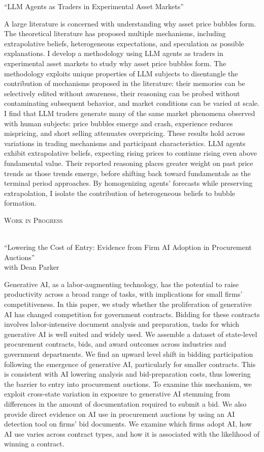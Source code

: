 \documentclass[11pt,a4paper]{article}
\newcommand{\header}[1]{
  {\hspace*{-18pt}\vspace*{6pt}\textsc{#1}}
  \vspace*{-6pt}\lineunder
  \vspace{2mm}
}
\newcommand{\lineunder}{
  \vspace*{-8pt}\\
  \hspace*{-18pt}\hrulefill\\
}
\begin{document}
``LLM Agents as Traders in Experimental Asset Markets''\\
\vspace{2mm}
{\small
A large literature is concerned with understanding why asset price bubbles form. The theoretical literature has proposed multiple mechanisms, including extrapolative beliefs, heterogeneous expectations, and speculation as possible explanations. I develop a methodology using LLM agents as traders in experimental asset markets to study why asset price bubbles form. The methodology exploits unique properties of LLM subjects to disentangle the contribution of mechanisms proposed in the literature: their memories can be selectively edited without awareness, their reasoning can be probed without contaminating subsequent behavior, and market conditions can be varied at scale. I find that LLM traders generate many of the same market phenomena observed with human subjects: price bubbles emerge and crash, experience reduces mispricing, and short selling attenuates overpricing. These results hold across variations in trading mechanisms and participant characteristics. LLM agents exhibit extrapolative beliefs, expecting rising prices to continue rising even above fundamental value. Their reported reasoning places greater weight on past price trends as those trends emerge, before shifting back toward fundamentals as the terminal period approaches. By homogenizing agents' forecasts while preserving extrapolation, I isolate the contribution of heterogeneous beliefs to bubble formation.\par
}
\vspace{1mm}

\header{Work in Progress}

``Lowering the Cost of Entry: Evidence from Firm AI Adoption in Procurement Auctions''\\
with Dean Parker\\
\vspace{2mm}
{\small
Generative AI, as a labor-augmenting technology, has the potential to raise productivity across a broad range of tasks, with implications for small firms' competitiveness. In this paper, we study whether the proliferation of generative AI has changed competition for government contracts. Bidding for these contracts involves labor-intensive document analysis and preparation, tasks for which generative AI is well suited and widely used. We assemble a dataset of state-level procurement contracts, bids, and award outcomes across industries and government departments. We find an upward level shift in bidding participation following the emergence of generative AI, particularly for smaller contracts. This is consistent with AI lowering analysis and bid-preparation costs, thus lowering the barrier to entry into procurement auctions. To examine this mechanism, we exploit cross-state variation in exposure to generative AI stemming from differences in the amount of documentation required to submit a bid. We also provide direct evidence on AI use in procurement auctions by using an AI detection tool on firms' bid documents. We examine which firms adopt AI, how AI use varies across contract types, and how it is associated with the likelihood of winning a contract.\par
}
\end{document}
